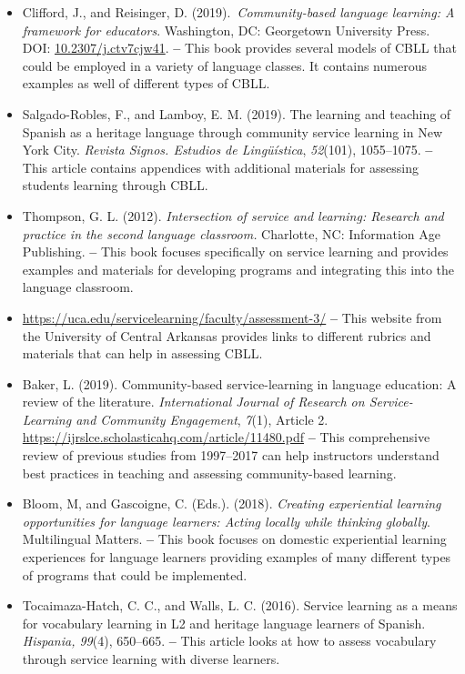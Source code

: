 \documentclass[output=paper]{langscibook}
\begin{document}
\begin{itemize}
\item Clifford, J., and Reisinger, D. (2019).~\textit{Community-based language learning: A framework for educators}. Washington, DC: Georgetown University Press. DOI: \href{https://doi.org/10.2307/j.ctv7cjw41}{10.2307/j.ctv7cjw41}.\textbf{ -- }This book provides several models of CBLL that could be employed in a variety of language classes. It contains numerous examples as well of different types of CBLL.
\item Salgado-Robles, F., and Lamboy, E. M. (2019). The learning and teaching of Spanish as a heritage language through community service learning in New York City. \textit{Revista Signos. Estudios de Lingüística}, \textit{52}(101), 1055--1075.\textbf{ -- }This article contains appendices with additional materials for assessing students learning through CBLL.
\item Thompson, G. L. (2012). \textit{Intersection of service and learning: Research and practice in the second language classroom.} Charlotte, NC: Information Age Publishing.\textbf{ -- }This book focuses specifically on service learning and provides examples and materials for developing programs and integrating this into the language classroom.
\item \url{https://uca.edu/servicelearning/faculty/assessment-3/} \textbf{-- }This website from the University of Central Arkansas provides links to different rubrics and materials that can help in assessing CBLL.
\item \begin{sloppypar}Baker, L. (2019). Community-based service-learning in language education: A review of the literature. \textit{International Journal of Research on Service-Learn\-ing and Community Engagement}, \textit{7}(1), Article 2. \url{https://ijrslce.scholasticahq.com/article/11480.pdf} \textbf{--} This comprehensive review of previous studies from 1997--2017 can help instructors understand best practices in teaching and assessing community-based learning.\end{sloppypar}
\item Bloom, M, and Gascoigne, C. (Eds.). (2018). \textit{Creating experiential learning opportunities for language learners: Acting locally while thinking globally}. Multilingual Matters. \textbf{--} This book focuses on domestic experiential learning experiences for language learners providing examples of many different types of programs that could be implemented.
\item Tocaimaza-Hatch, C. C., and Walls, L. C. (2016). Service learning as a means for vocabulary learning in L2 and heritage language learners of Spanish. \textit{Hispania, 99}(4), 650--665. \textbf{--} This article looks at how to assess vocabulary through service learning with diverse learners.
\end{itemize}
\end{document}
